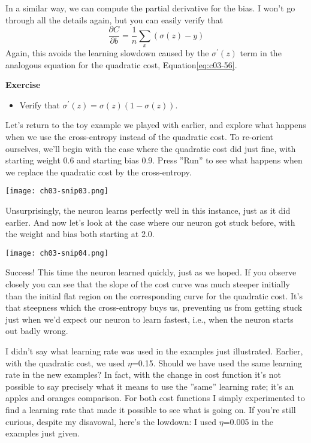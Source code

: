 In a similar way, we can compute the partial derivative for the bias. I won't go through all the details again, but you can easily verify that 
\begin{equation}
\frac{\partial C}{\partial b}=\frac{1}{n} \sum_{x}(\sigma(z)-y)
\label{eq:c03-62}
\end{equation}
Again, this avoids the learning slowdown caused by the $\sigma^{\prime}(z)$ 
term in the analogous equation for the quadratic cost, Equation\ref{eq:c03-56}.

\textbf{Exercise}

\begin{itemize}
\item Verify that $\sigma^{\prime}(z)=\sigma(z)(1-\sigma(z))$.
\end{itemize}



Let's return to the toy example we played with earlier, and explore what happens when we use the cross-entropy instead of the quadratic cost. To re-orient ourselves, we'll begin with the case where the quadratic cost did just fine, with starting weight 0.6 and starting bias 0.9. Press ''Run'' to see what happens when we replace the quadratic cost by the cross-entropy.

\begin{marginfigure}
\texttt{[image: ch03-snip03.png]}
\end{marginfigure}

Unsurprisingly, the neuron learns perfectly well in this instance, just as it did earlier. And now let's look at the case where our neuron got stuck before, with the weight and bias both starting at 2.0.

\begin{marginfigure}
\texttt{[image: ch03-snip04.png]}
\end{marginfigure}


Success! This time the neuron learned quickly, just as we hoped. If you observe closely you can see that the slope of the cost curve was much steeper initially than the initial flat region on the corresponding curve for the quadratic cost. It's that steepness which the cross-entropy buys us, preventing us from getting stuck just when we'd expect our neuron to learn fastest, i.e., when the neuron starts out badly wrong.

I didn't say what learning rate was used in the examples just illustrated. Earlier, with the quadratic cost, we used $\eta$=0.15. Should we have used the same learning rate in the new examples? In fact, with the change in cost function it's not possible to say precisely what it means to use the ''same'' learning rate; it's an apples and oranges comparison. For both cost functions I simply experimented to find a learning rate that made it possible to see what is going on. If you're still curious, despite my disavowal, here's the lowdown: I used  $\eta$=0.005 in the examples just given.

